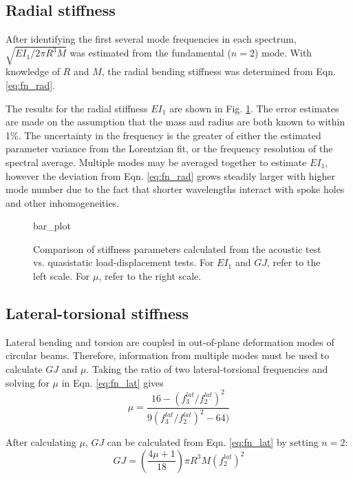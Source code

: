 \documentclass[../thesis.tex]{subfiles}
\begin{document}
\subsection{Radial stiffness}

After identifying the first several mode frequencies in each spectrum, $\sqrt{EI_1/2\pi R^3M}$ was estimated from the fundamental ($n=2$) mode. With knowledge of $R$ and $M$, the radial bending stiffness was determined from Eqn. \eqref{eq:fn_rad}.

The results for the radial stiffness $EI_1$ are shown in Fig. \ref{fig:bar}. The error estimates are made on the assumption that the mass and radius are both known to within 1\%. The uncertainty in the frequency is the greater of either the estimated parameter variance from the Lorentzian fit, or the frequency resolution of the spectral average. Multiple modes may be averaged together to estimate $EI_1$, however the deviation from Eqn. \eqref{eq:fn_rad} grows steadily larger with higher mode number due to the fact that shorter wavelengths interact with spoke holes and other inhomogeneities.

\begin{figure}
  {bar_plot}
  \caption{Comparison of stiffness parameters calculated from the acoustic test vs. quasistatic load-displacement tests. For $EI_1$ and $GJ$, refer to the left scale. For $\mu$, refer to the right scale.}
  \label{fig:bar}
\end{figure}

\subsection{Lateral-torsional stiffness}

Lateral bending and torsion are coupled in out-of-plane deformation modes of circular beams. Therefore, information from multiple modes must be used to calculate $GJ$ and $\mu$. Taking the ratio of two lateral-torsional frequencies and solving for $\mu$ in Eqn. \eqref{eq:fn_lat} gives
  \begin{equation}\label{eq:mu}
  \mu = \frac{16 - (f_3^{lat}/f_2^{lat})^2}{9(f_3^{lat}/f_2^{lat})^2 - 64)}
  \end{equation}

After calculating $\mu$, $GJ$ can be calculated from Eqn. \eqref{eq:fn_lat} by setting $n=2$:
  \begin{equation}\label{eq:GJ}
  GJ = \left(\frac{4\mu + 1}{18} \right ) \pi R^3M(f_2^{lat})^2
  \end{equation}
\end{document}
